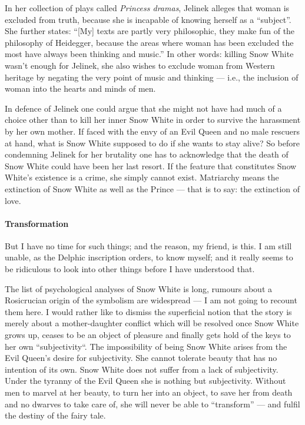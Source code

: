 In her collection of plays called \emph{Princess dramas}, Jelinek alleges that woman is excluded from truth, because she is incapable of knowing herself as a “subject”. She further states: “[My] texts are partly very philosophic, they make fun of the philosophy of Heidegger, because the areas where woman has been excluded the most have always been thinking and music.” In other words: killing Snow White wasn't enough for Jelinek, she also wishes to exclude woman from Western heritage by negating the very point of music and thinking — i.e., the inclusion of woman into the hearts and minds of men.

In defence of Jelinek one could argue that she might not have had much of a choice other than to kill her inner Snow White in order to survive the harassment by her own mother. If faced with the envy of an Evil Queen and no male rescuers at hand, what is Snow White supposed to do if she wants to stay alive? So before condemning Jelinek for her brutality one has to acknowledge that the death of Snow White could have been her last resort. If the feature that constitutes Snow White's existence is a crime, she simply cannot exist. Matriarchy means the extinction of Snow White as well as the Prince — that is to say: the extinction of love.

\paragraph{Transformation}
\begin{quotex}
But I have no time for such things; and the reason, my friend, is this. I am still unable, as the Delphic inscription orders, to know myself; and it really seems to be ridiculous to look into other things before I have understood that. 

\end{quotex}
The list of psychological analyses of Snow White is long, rumours about a Rosicrucian origin of the symbolism are widespread — I am not going to recount them here. I would rather like to dismiss the superficial notion that the story is merely about a mother-daughter conflict which will be resolved once Snow White grows up, ceases to be an object of pleasure and finally gets hold of the keys to her own “subjectivity“. The impossibility of being Snow White arises from the Evil Queen's desire for subjectivity. She cannot tolerate beauty that has no intention of its own. Snow White does not suffer from a lack of subjectivity. Under the tyranny of the Evil Queen she is nothing but subjectivity. Without men to marvel at her beauty, to turn her into an object, to save her from death and no dwarves to take care of, she will never be able to “transform” — and fulfil the destiny of the fairy tale.

